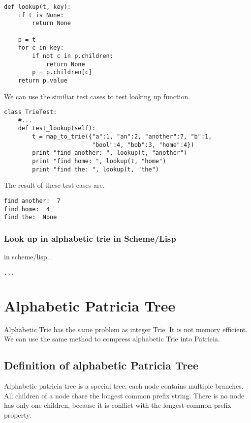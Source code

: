 \documentclass{article}
\begin{document}
\lstset{language=Python}
\begin{lstlisting}
def lookup(t, key):
    if t is None:
        return None

    p = t
    for c in key:
        if not c in p.children:
            return None
        p = p.children[c]
    return p.value
\end{lstlisting}

We can use the similiar test cases to test looking up function.

\begin{lstlisting}
class TrieTest:
    #...
    def test_lookup(self):
        t = map_to_trie({"a":1, "an":2, "another":7, "b":1, 
                         "bool":4, "bob":3, "home":4})
        print "find another: ", lookup(t, "another")
        print "find home: ", lookup(t, "home")
        print "find the: ", lookup(t, "the")
\end{lstlisting}

The result of these test cases are.

\begin{verbatim}
find another:  7
find home:  4
find the:  None
\end{verbatim}

\subsubsection*{Look up in alphabetic trie in Scheme/Lisp}
in scheme/lisp...

\lstset{language=lisp}
\begin{lstlisting}
...
\end{lstlisting}

\section{Alphabetic Patricia Tree}
Alphabetic Trie has the same problem as integer Trie. It is not memory
efficient. We can use the same method to compress alphabetic Trie into
Patricia.

\subsection{Definition of alphabetic Patricia Tree}
Alphabetic patricia tree is a special tree, each node contains
multiple branches. All children of a node share the longest common 
prefix string. There is no node has only one children, because it
is conflict with the longest common prefix property.
\end{document}
